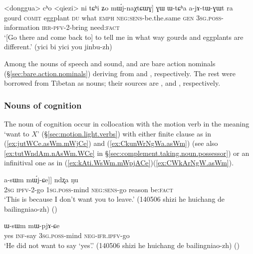 \begin{exe}
\ex  \label{ex:WtCha.ajAtWGWt}
\gll <donggua> cʰo <qiezi> ni tɕʰi ʑo mɯ́j-naχtɕɯɣ] ɣɯ ɯ-tɕʰa a-jɤ-tɯ-ɣɯt ra \\
gourd \textsc{comit} eggplant \textsc{du} what \textsc{emph} \textsc{neg}:\textsc{sens}-be.the.same \textsc{gen} \textsc{3sg}.\textsc{poss}-information \textsc{irr}-\textsc{pfv}-2-bring need:\textsc{fact} \\
\glt `[Go there and come back to] to tell me in what way gourds and eggplants are different.' (yici bi yici you jinbu-zh)
\end{exe}

Among the nouns of speech and sound,   and  are bare action nominals (§\ref{sec:bare.action.nominals}) deriving from  and , respectively. The rest were borrowed from Tibetan as nouns; their sources are ,  and , respectively.

\subsubsection{Nouns of cognition} \label{sec:nouns.cognition.complement}
The noun of cognition  occur in collocation with the motion verb  in the meaning `want to $X$' (§\ref{sec:motion.light.verbs}) with either finite clause as in (\ref{ex:jutWCe.asWm.mWjCe}) and (\ref{ex:CkunWrNgWa.asWm}) (see also \ref{ex:tutWndAm.nAsWm.WCe} in §\ref{sec:complement.taking.noun.possessor}) or an infinitival one as in (\ref{ex:kAti.WsWm.mWpjACe})(\ref{ex:CWkArNgW.asWm}).


\begin{exe}
\ex  \label{ex:jutWCe.asWm.mWjCe}
\gll [[nɤʑo ju-tɯ-ɕe] a-sɯm mɯ́j-ɕe]] ndʐa ŋu \\
\textsc{2sg} \textsc{ipfv}-2-go \textsc{1sg}.\textsc{poss}-mind \textsc{neg}:\textsc{sens}-go reason be:\textsc{fact} \\
\glt `This is because I don't want you to leave.' (140506 shizi he huichang de bailingniao-zh)
()
\end{exe}

\begin{exe}
\ex  \label{ex:kAti.WsWm.mWpjACe}
\gll [``ɣa" kɤ-ti] ɯ-sɯm mɯ-pjɤ-ɕe \\
yes \textsc{inf}-say \textsc{3sg}.\textsc{poss}-mind \textsc{neg}-\textsc{ifr}.\textsc{ipfv}-go \\
\glt `He did not want to say `yes'.' (140506 shizi he huichang de bailingniao-zh)
()
\end{exe}

